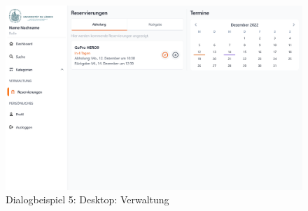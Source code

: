 \begin{figure}[p]
    \centering
    \includegraphics[scale=0.25]{Bilder/Dialgobeispiel/Verwaltung.png}
    \caption{Dialogbeispiel 5: Desktop: Verwaltung}\label{fig:georg}
\end{figure}
